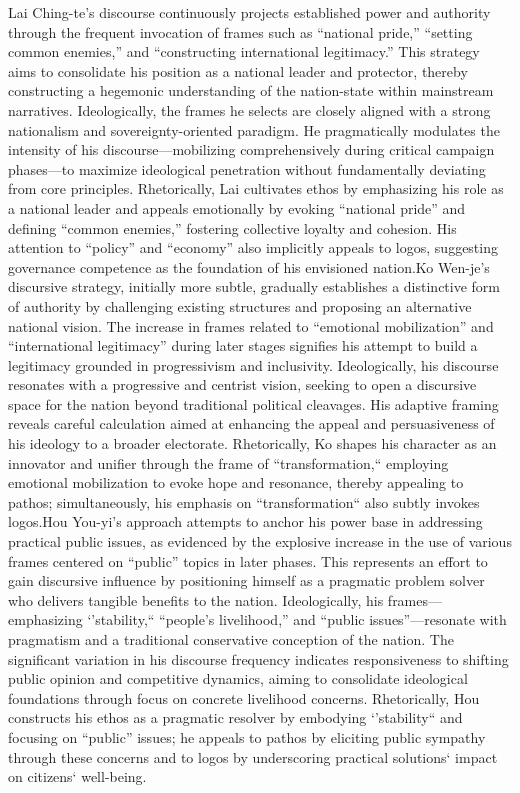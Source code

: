 \documentclass[man,12pt]{apa7}
\begin{document}
Lai Ching-te's discourse continuously projects established power and authority through the frequent invocation of frames such as ``national pride,'' ``setting common enemies,'' and ``constructing international legitimacy.'' This strategy aims to consolidate his position as a national leader and protector, thereby constructing a hegemonic understanding of the nation-state within mainstream narratives. Ideologically, the frames he selects are closely aligned with a strong nationalism and sovereignty-oriented paradigm. He pragmatically modulates the intensity of his discourse—mobilizing comprehensively during critical campaign phases—to maximize ideological penetration without fundamentally deviating from core principles. Rhetorically, Lai cultivates ethos by emphasizing his role as a national leader and appeals emotionally by evoking ``national pride'' and defining ``common enemies,'' fostering collective loyalty and cohesion. His attention to ``policy'' and ``economy'' also implicitly appeals to logos, suggesting governance competence as the foundation of his envisioned nation.Ko Wen-je's discursive strategy, initially more subtle, gradually establishes a distinctive form of authority by challenging existing structures and proposing an alternative national vision. The increase in frames related to ``emotional mobilization'' and ``international legitimacy'' during later stages signifies his attempt to build a legitimacy grounded in progressivism and inclusivity. Ideologically, his discourse resonates with a progressive and centrist vision, seeking to open a discursive space for the nation beyond traditional political cleavages. His adaptive framing reveals careful calculation aimed at enhancing the appeal and persuasiveness of his ideology to a broader electorate. Rhetorically, Ko shapes his character as an innovator and unifier through the frame of ``transformation,`` employing emotional mobilization to evoke hope and resonance, thereby appealing to pathos; simultaneously, his emphasis on ``transformation`` also subtly invokes logos.Hou You-yi's approach attempts to anchor his power base in addressing practical public issues, as evidenced by the explosive increase in the use of various frames centered on ``public'' topics in later phases. This represents an effort to gain discursive influence by positioning himself as a pragmatic problem solver who delivers tangible benefits to the nation. Ideologically, his frames—emphasizing `'stability,`` ``people's livelihood,'' and ``public issues''—resonate with pragmatism and a traditional conservative conception of the nation. The significant variation in his discourse frequency indicates responsiveness to shifting public opinion and competitive dynamics, aiming to consolidate ideological foundations through focus on concrete livelihood concerns. Rhetorically, Hou constructs his ethos as a pragmatic resolver by embodying `'stability`` and focusing on ``public'' issues; he appeals to pathos by eliciting public sympathy through these concerns and to logos by underscoring practical solutions` impact on citizens` well-being.
\fi
\end{document}

